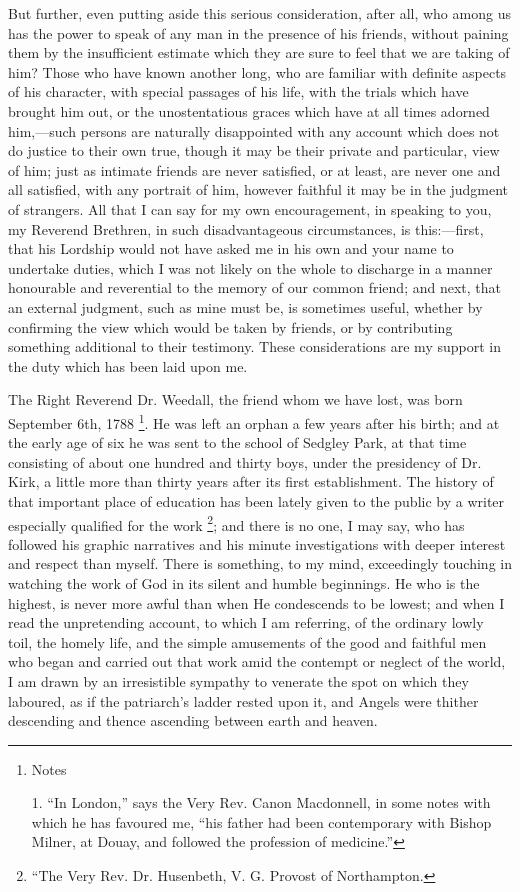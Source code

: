 But further, even putting aside this serious
consideration, after all, who among us has the power to
speak of any man in the presence of his friends, without
paining them by the insufficient estimate which they are
sure to feel that we are taking of him? Those who have
known another long, who are familiar with definite
aspects of his character, with special passages of his
life, with the trials which have brought him out, or the
unostentatious graces which have at all times adorned
him,—such persons are naturally disappointed with
any account which does not do justice to their own true,
though it may be their private and particular, view of
him; just as intimate friends are never satisfied, or at
least, are never one and all satisfied, with any portrait
of him, however faithful it may be in the judgment of
strangers. All that I can say for my own encouragement,
in speaking to you, my Reverend Brethren, in such
disadvantageous circumstances, is this:—first, that
his Lordship would not have asked me in his own and your
name to undertake duties, which I was not likely on the
whole to discharge in a manner honourable and reverential to the memory of our common friend; and next, that an
external judgment, such as mine must be, is sometimes
useful, whether by confirming the view which would be
taken by friends, or by contributing something additional
to their testimony. These considerations are my support
in the duty which has been laid upon me.

The Right Reverend Dr. Weedall, the friend whom we
have lost, was born September 6th, 1788 \footnote{Notes

1. ``In London,'' says the Very Rev. Canon
Macdonnell, in some notes with which he has favoured me,
``his father had been contemporary with Bishop
Milner, at Douay, and followed the profession of
medicine.''}. He was
left an orphan a few years after his birth; and at the
early age of six he was sent to the school of Sedgley
Park, at that time consisting of about one hundred and
thirty boys, under the presidency of Dr. Kirk, a little
more than thirty years after its first establishment. The
history of that important place of education has been
lately given to the public by a writer especially
qualified for the work \footnote{``The Very Rev. Dr.
Husenbeth, V. G. Provost of Northampton.}; and there is no one, I may
say, who has followed his graphic narratives and his
minute investigations with deeper interest and respect
than myself. There is something, to my mind, exceedingly
touching in watching the work of God in its silent and
humble beginnings. He who is the highest, is never more
awful than when He condescends to be lowest; and when I
read the unpretending account, to which I am referring,
of the ordinary lowly toil, the homely life, and the
simple amusements of the good and faithful men who began
and carried out that work amid the contempt or neglect of
the world, I am drawn by an irresistible sympathy to
venerate the spot on which they laboured, as if the
patriarch's ladder rested upon it, and Angels were
thither descending and thence ascending between earth and
heaven.

